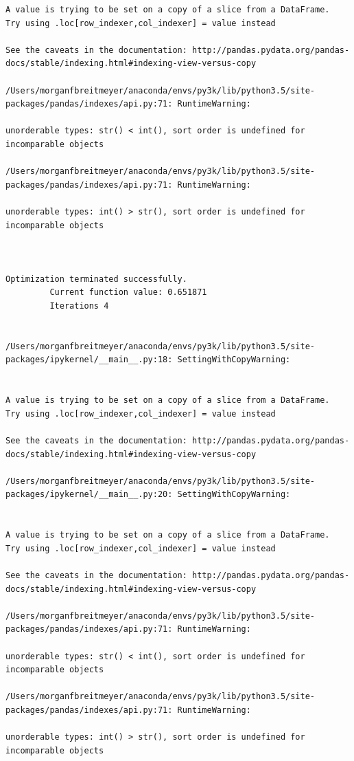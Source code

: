 \begin{lstlisting}
A value is trying to be set on a copy of a slice from a DataFrame.
Try using .loc[row_indexer,col_indexer] = value instead

See the caveats in the documentation: http://pandas.pydata.org/pandas-docs/stable/indexing.html#indexing-view-versus-copy

/Users/morganfbreitmeyer/anaconda/envs/py3k/lib/python3.5/site-packages/pandas/indexes/api.py:71: RuntimeWarning:

unorderable types: str() < int(), sort order is undefined for incomparable objects

/Users/morganfbreitmeyer/anaconda/envs/py3k/lib/python3.5/site-packages/pandas/indexes/api.py:71: RuntimeWarning:

unorderable types: int() > str(), sort order is undefined for incomparable objects



Optimization terminated successfully.
         Current function value: 0.651871
         Iterations 4


/Users/morganfbreitmeyer/anaconda/envs/py3k/lib/python3.5/site-packages/ipykernel/__main__.py:18: SettingWithCopyWarning:


A value is trying to be set on a copy of a slice from a DataFrame.
Try using .loc[row_indexer,col_indexer] = value instead

See the caveats in the documentation: http://pandas.pydata.org/pandas-docs/stable/indexing.html#indexing-view-versus-copy

/Users/morganfbreitmeyer/anaconda/envs/py3k/lib/python3.5/site-packages/ipykernel/__main__.py:20: SettingWithCopyWarning:


A value is trying to be set on a copy of a slice from a DataFrame.
Try using .loc[row_indexer,col_indexer] = value instead

See the caveats in the documentation: http://pandas.pydata.org/pandas-docs/stable/indexing.html#indexing-view-versus-copy

/Users/morganfbreitmeyer/anaconda/envs/py3k/lib/python3.5/site-packages/pandas/indexes/api.py:71: RuntimeWarning:

unorderable types: str() < int(), sort order is undefined for incomparable objects

/Users/morganfbreitmeyer/anaconda/envs/py3k/lib/python3.5/site-packages/pandas/indexes/api.py:71: RuntimeWarning:

unorderable types: int() > str(), sort order is undefined for incomparable objects




\end{lstlisting}
